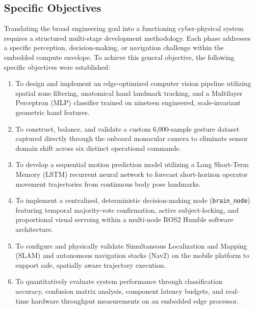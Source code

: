 \subsection{Specific Objectives}
Translating the broad engineering goal into a functioning cyber-physical system requires a structured multi-stage development methodology. Each phase addresses a specific perception, decision-making, or navigation challenge within the embedded compute envelope. To achieve this general objective, the following specific objectives were established:
\begin{enumerate}
    \item To design and implement an edge-optimized computer vision pipeline utilizing spatial zone filtering, anatomical hand landmark tracking, and a Multilayer Perceptron (MLP) classifier trained on nineteen engineered, scale-invariant geometric hand features.
    \item To construct, balance, and validate a custom 6,000-sample gesture dataset captured directly through the onboard monocular camera to eliminate sensor domain shift across six distinct operational commands.
    \item To develop a sequential motion prediction model utilizing a Long Short-Term Memory (LSTM) recurrent neural network to forecast short-horizon operator movement trajectories from continuous body pose landmarks.
    \item To implement a centralized, deterministic decision-making node (\texttt{brain\_node}) featuring temporal majority-vote confirmation, active subject-locking, and proportional visual servoing within a multi-node ROS2 Humble software architecture.
    \item To configure and physically validate Simultaneous Localization and Mapping (SLAM) and autonomous navigation stacks (Nav2) on the mobile platform to support safe, spatially aware trajectory execution.
    \item To quantitatively evaluate system performance through classification accuracy, confusion matrix analysis, component latency budgets, and real-time hardware throughput measurements on an embedded edge processor.
\end{enumerate}

